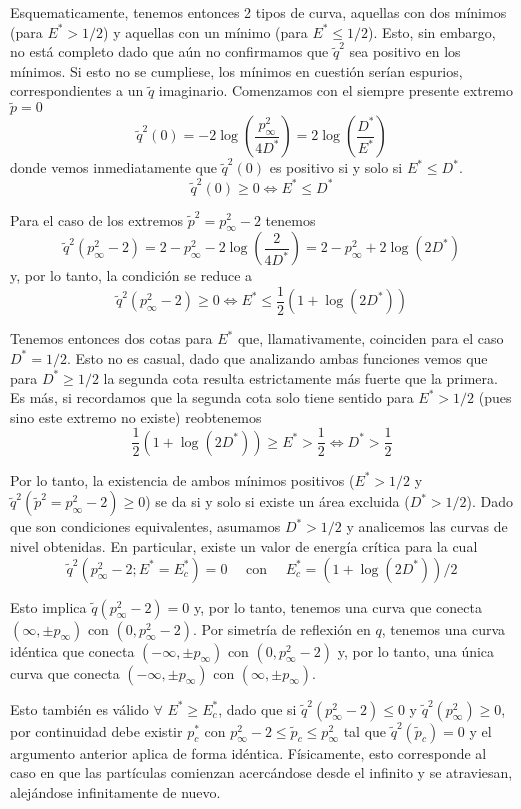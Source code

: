Esquematicamente, tenemos entonces 2 tipos de curva, aquellas con dos mínimos (para $E^* > 1/2$) y aquellas con un mínimo (para $E^* \leq 1/2$).
Esto, sin embargo, no está completo dado que aún no confirmamos que $\tilde{q}^2$ sea positivo en los mínimos.
Si esto no se cumpliese, los mínimos en cuestión serían espurios, correspondientes a un $\tilde{q}$ imaginario.
Comenzamos con el siempre presente extremo $\tilde{p}=0$
\[ \tilde{q}^2(0) = -2\log \left( \frac{p_\infty^2}{4D^*} \right) = 2\log \left( \frac{D^*}{E^*} \right) \]
donde vemos inmediatamente que $\tilde{q}^2(0)$ es positivo si y solo si $E^*\leq D^*$.
\[ \tilde{q}^2(0) \geq 0 \Longleftrightarrow  E^*\leq D^* \]

Para el caso de los extremos $\tilde{p}^2=p^2_\infty - 2$ tenemos
\[ \tilde{q}^2(p^2_\infty-2) = 2-p_\infty^2 -2\log \left( \frac{2}{4D^*} \right) = 2 - p_\infty^2 + 2\log \left( 2D^* \right)  \]
y, por lo tanto, la condición se reduce a 
\[ \tilde{q}^2(p^2_\infty-2) \geq 0 \Leftrightarrow E^*\leq \frac{1}{2}\left( 1 + \log(2D^*) \right) \]

Tenemos entonces dos cotas para $E^*$ que, llamativamente, coinciden para el caso $D^*=1/2$.
Esto no es casual, dado que analizando ambas funciones vemos que para $D^*\geq1/2$ la segunda cota resulta estrictamente más fuerte que la primera.
Es más, si recordamos que la segunda cota solo tiene sentido para $E^*>1/2$ (pues sino este extremo no existe) reobtenemos
\[ \frac{1}{2} ( 1 + \log(2D^*) ) \geq E^*> \frac{1}{2} \Longleftrightarrow D^* > \frac{1}{2} \]

Por lo tanto, la existencia de ambos mínimos positivos ($E^*>1/2$ y $\tilde{q}^2(\tilde{p}^2=p^2_\infty-2)\geq 0$) se da si y solo si existe un área excluida ($D^*>1/2$).
Dado que son condiciones equivalentes, asumamos $D^*>1/2$ y analicemos las curvas de nivel obtenidas.
En particular, existe un valor de energía crítica para la cual 
\[\tilde{q}^2(p^2_\infty-2; E^*=E^*_c) = 0 \quad \text{ con } \quad E^*_c = (1+\log(2D^*))/2\]

Esto implica $\tilde{q}(p^2_\infty-2)=0$ y, por lo tanto, tenemos una curva que conecta $(\infty, \pm p_\infty)$ con $(0,p^2_\infty-2)$.
Por simetría de reflexión en $q$, tenemos una curva idéntica que conecta $(-\infty, \pm p_\infty)$ con $(0,p^2_\infty-2)$ y, por lo tanto, una única curva que conecta $(-\infty, \pm p_\infty)$ con $(\infty, \pm p_\infty)$.

Esto también es válido $\forall$ $E^*\geq E^*_c$, dado que si $\tilde{q}^2(p_\infty^2-2)\leq 0$ y $\tilde{q}^2(p_\infty^2)\geq 0$, por continuidad debe existir 
$p_c^*$ con $p_\infty^2-2\leq \tilde{p}_c\leq p_\infty^2$  tal que $\tilde{q}^2(\tilde{p}_c) = 0$ y el argumento anterior aplica de forma idéntica.
Físicamente, esto corresponde al caso en que las partículas comienzan acercándose desde el infinito y se atraviesan, alejándose infinitamente de nuevo.

